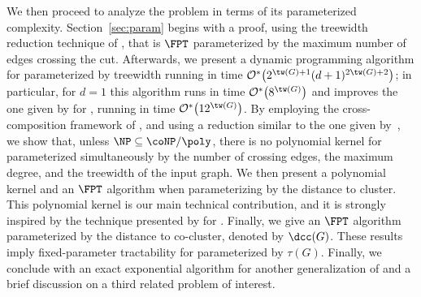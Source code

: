 We then proceed to analyze the problem in terms of its parameterized complexity.
Section~\ref{sec:param} begins with a proof, using the treewidth reduction technique of \cite{marx_treewidth_reduction}, that  is $\FPT$ parameterized by the maximum number of edges crossing the cut.
Afterwards, we present a dynamic programming algorithm for  parameterized by treewidth running in time $\bigOs{2^{\tw(G)+1}(d+1)^{2\tw(G) + 2}}$; in particular, for $d=1$ this algorithm runs in time $\bigOs{8^{\tw(G)}}$ and improves the one given by \cite{matching_cut_structural} for , running in time  $\bigOs{12^{\tw(G)}}$.
By employing the cross-composition framework of \cite{cross_composition}, and using a reduction similar to the one given by~\cite{matching_cut_ipec}, we show that, unless $\NP \subseteq \coNP/\poly$, there is no polynomial kernel for  parameterized simultaneously by the number of crossing edges, the maximum degree, and the treewidth of the input graph.
We then present a polynomial kernel and an $\FPT$ algorithm when parameterizing by the distance to cluster.
This polynomial kernel is our main technical contribution, and it is strongly inspired by the technique presented by \cite{matching_cut_ipec} for . Finally, we give an $\FPT$ algorithm parameterized by the distance to co-cluster, denoted by $\dcc(G)$.
These results imply fixed-parameter tractability for  parameterized by $\tau(G)$.
Finally, we conclude with an exact exponential algorithm for another generalization of  and a brief discussion on a third related problem of interest.






